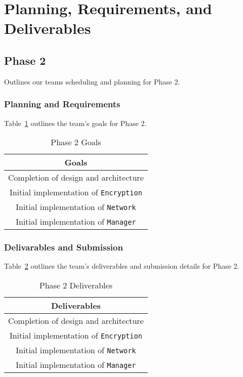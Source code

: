 \documentclass[sigconf]{acmart}
\begin{document}
\section{Planning, Requirements, and Deliverables}

\subsection{Phase 2}
Outlines our teams scheduling and planning for Phase 2.

\subsubsection{Planning and Requirements}
Table~\ref{Phase 2 Goals} outlines the team's goals for Phase 2.
\begin{table}[htb]
	\centering
	\caption{Phase 2 Goals}
	\label{Phase 2 Goals}

	\begin{tabular}{|c|} \hline
		\textbf{Goals}                                \\ \hline
		Completion of design and architecture         \\ \hline
		Initial implementation of \texttt{Encryption} \\ \hline
		Initial implementation of \texttt{Network}    \\ \hline
		Initial implementation of \texttt{Manager}    \\ \hline
	\end{tabular}
\end{table}

\subsubsection{Delivarables and Submission}
Table~\ref{Phase 2 Deliverables} outlines the team's deliverables and submission details for Phase
2.
\begin{table}[htb]
	\centering
	\caption{Phase 2 Deliverables}
	\label{Phase 2 Deliverables}

	\begin{tabular}{|c|} \hline
		\textbf{Deliverables}                         \\ \hline
		Completion of design and architecture         \\ \hline
		Initial implementation of \texttt{Encryption} \\ \hline
		Initial implementation of \texttt{Network}    \\ \hline
		Initial implementation of \texttt{Manager}    \\ \hline
	\end{tabular}
\end{table}
\end{document}

